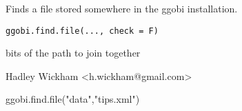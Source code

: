 \begin{Description}\relax
Finds a file stored somewhere in the ggobi installation.
\end{Description}
\begin{Usage}
\begin{verbatim}ggobi.find.file(..., check = F)\end{verbatim}
\end{Usage}
\begin{Arguments}
\begin{ldescription}
\item[\code{...}] bits of the path to join together
\item[\code{check}] 
\end{ldescription}
\end{Arguments}
\begin{Details}\relax
\end{Details}
\begin{Author}\relax
Hadley Wickham <h.wickham@gmail.com>
\end{Author}
\begin{Examples}
\begin{ExampleCode}ggobi.find.file("data","tips.xml")\end{ExampleCode}
\end{Examples}

